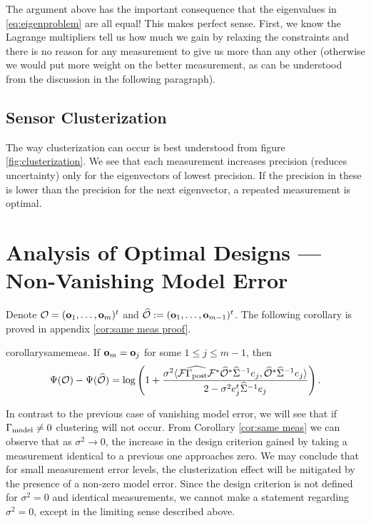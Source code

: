 \documentclass{amsart}
\numberwithin{equation}{section}
\begin{document}
The argument above has the important consequence that the eigenvalues
in \eqref{eq:eigenproblem} are all equal! This makes perfect
sense. First, we know the Lagrange multipliers tell us how much we
gain by relaxing the constraints and there is no reason for any
measurement to give us more than any other (otherwise we would put
more weight on the better measurement, as can be understood from the
discussion in the following paragraph).%

\subsection{Sensor Clusterization}\label{subsec:clusterization}
The way clusterization can occur is best understood from figure
\ref{fig:clusterization}. We see that each measurement increases
precision (reduces uncertainty) only for the eigenvectors of lowest
precision. If the precision in these is lower than the precision for
the next eigenvector, a repeated measurement is optimal.

\section{Analysis of Optimal Designs --- Non-Vanishing Model Error}
Denote $\mathcal{O} = (\mathbf{o}_1,\dots,\mathbf{o}_m)^t$ and $\widehat{\mathcal{O}} :=
(\mathbf{o}_1,\dots,\mathbf{o}_{m-1})^t$. The following corollary is proved in
appendix \ref{cor:same meas proof}.
\begin{restatable*}{corollary}{samemeas}\label{cor:same meas}.
  If $\mathbf{o}_m = \mathbf{o}_j$ for some $1 \leq j \leq m-1$, then
  \begin{equation*}
    \Psi(\mathcal{O}) - \Psi(\widehat{\mathcal{O}}) =
    \log \left ( 1 + \frac{\sigma^2
      \langle \mathcal{F} \widehat{\Gamma_{\textup{post}}} \mathcal{F}^* \widehat{\mathcal{O}}^* \widehat{\Sigma}^{-1} e_j,
      \widehat{\mathcal{O}}^* \widehat{\Sigma}^{-1}e_j \rangle
    }{
      2 - \sigma^2 e_j^t\widehat{\Sigma}^{-1}e_j 
    }       
    \right ).
  \end{equation*}
\end{restatable*}

In contrast to the previous case of vanishing model error, we will see
that if $\Gamma_{\textup{model}} \neq 0$ clustering will not occur. From Corollary
\ref{cor:same meas} we can observe that as $\sigma^2 \to 0$, the
increase in the design criterion gained by taking a measurement
identical to a previous one approaches zero. We may conclude that for
small measurement error levels, the clusterization effect will be
mitigated by the presence of a non-zero model error. Since the design
criterion is not defined for $\sigma^2 = 0$ and identical
measurements, we cannot make a statement regarding $\sigma^2 = 0$,
except in the limiting sense described above.
\end{document}
